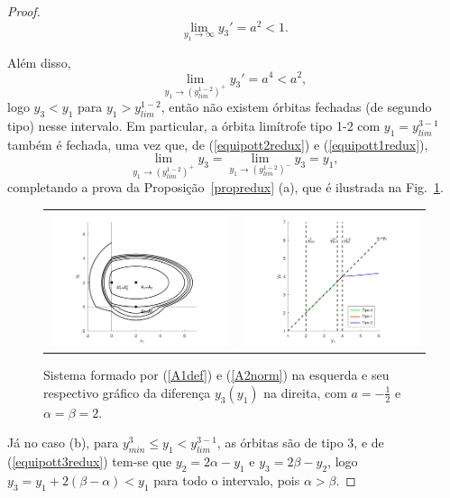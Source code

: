 \begin{proof}
$$\lim_{y_1\to \infty}y_3'=a^2<1.$$

Além disso, 
$$\lim_{y_1\to (y_{lim}^{1-2})^+} y_3'=a^4<a^2,$$
logo $y_3<y_1$ para $y_1>y_{lim}^{1-2}$, então não existem órbitas fechadas (de segundo tipo) nesse intervalo. Em particular, a órbita limítrofe tipo 1-2 com $y_1=y_{lim}^{3-1}$ também é fechada, uma vez que, de (\ref{equipott2redux}) e (\ref{equipott1redux}),
$$
\lim_{y_1\to (y_{lim}^{1-2})^+}y_3=\lim_{y_1\to (y_{lim}^{1-2})^-}y_3=y_1,
$$
completando a prova da Proposição~\ref{propredux} (a), que é ilustrada na Fig.~\ref{2x1_yeqx_eq}.

\begin{figure}[H]
\centering
\begin{table}[H]
\centering
\begin{tabular}{cc}
\includegraphics[width=7cm]{images/2x1_yeqx_eq.png}
&
\includegraphics[width=7cm]{images/2x1_yeqx_eq_y3.png}
\end{tabular}
\end{table}
\caption{\centering\label{2x1_yeqx_eq}Sistema formado por (\ref{A1def}) e (\ref{A2norm}) na esquerda e seu respectivo gráfico da diferença $y_3(y_1)$ na direita, com $a=-\frac{1}{2}$ e $\alpha=\beta=2$.}
\end{figure}

Já no caso (b), para $y_{min}^3\leq y_1<y_{lim}^{3-1}$, as órbitas são de tipo 3, e de (\ref{equipott3redux}) tem-se que $y_2=2\alpha-y_1$ e $y_3=2\beta-y_2$, logo $y_3=y_1+2(\beta-\alpha)<y_1$ para todo o intervalo, pois $\alpha>\beta$.


\end{proof}
